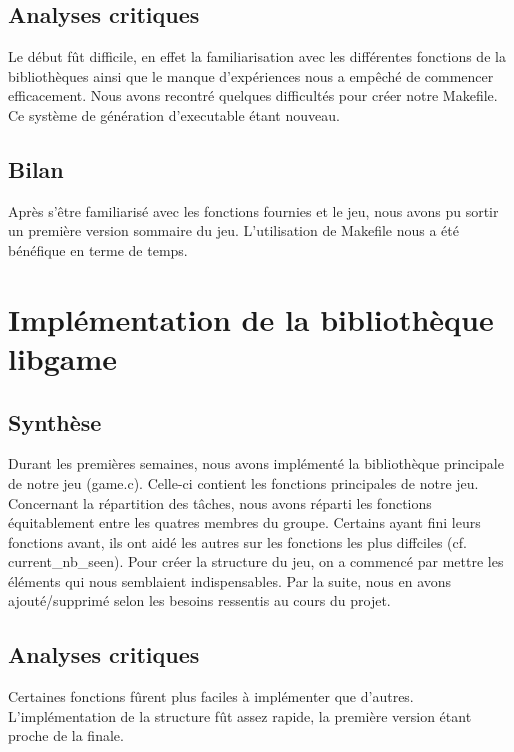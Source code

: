 \documentclass[12pt]{report}
\begin{document}
\section{Analyses critiques}
\begin{normalsize}
Le début fût difficile, en effet la familiarisation avec les différentes fonctions de la bibliothèques ainsi que le manque d'expériences nous a empêché de commencer efficacement.
Nous avons recontré quelques difficultés pour créer notre Makefile. Ce système de génération d'executable étant nouveau.
\end{normalsize}

\section{Bilan}
\begin{normalsize}
Après s'être familiarisé avec les fonctions fournies et le jeu, nous avons pu sortir un première version sommaire du jeu. L'utilisation de Makefile nous a été bénéfique en terme de temps. 
\end{normalsize}

\chapter{Implémentation de la bibliothèque libgame}
\section{Synthèse}
\begin{normalsize}
Durant les premières semaines, nous avons implémenté la bibliothèque principale de notre jeu (game.c). Celle-ci contient les fonctions principales de notre jeu.
Concernant la répartition des tâches, nous avons réparti les fonctions équitablement entre les quatres membres du groupe. Certains ayant fini leurs fonctions avant, ils ont aidé les autres sur les fonctions les plus diffciles (cf. current\_nb\_seen). Pour créer la structure du jeu, on a commencé par mettre les éléments qui nous semblaient indispensables. Par la suite, nous en avons ajouté/supprimé selon les besoins ressentis au cours du projet. 
\end{normalsize}
\section{Analyses critiques}
\begin{normalsize}
Certaines fonctions fûrent plus faciles à implémenter que d'autres. L'implémentation de la structure fût assez rapide, la première version étant proche de la finale.   
\end{normalsize}
\end{document}
